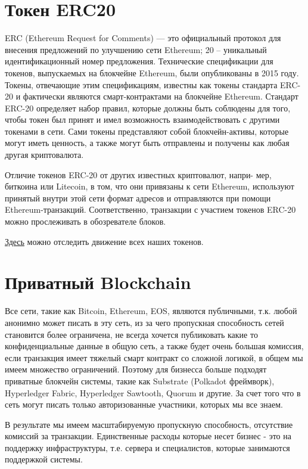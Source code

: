 \documentclass[a4paper,12pt]{report}
\newcommand{\contractAddress}{0x37d29cb7d543300063a50d85389d409c01da7945}
\begin{document}
\section{Токен ERC20}
ERC (Ethereum Request for Comments) — это официальный протокол для внесения предложений по улучшению сети Ethereum; 20 – уникальный идентификационный номер предложения. Технические спецификации для токенов, выпускаемых на блокчейне Ethereum, были опубликованы в 2015 году. Токены, отвечающие этим спецификациям, известны как токены стандарта ERC-20 и фактически являются смарт-контрактами на блокчейне Ethereum. Стандарт ERC-20 определяет набор правил, которые должны быть
соблюдены для того, чтобы токен был принят и имел возможность взаимодействовать с другими токенами в сети. Сами токены представляют собой блокчейн-активы, которые могут иметь ценность, а также могут быть отправлены и получены как любая другая криптовалюта. 

Отличие токенов ERC-20 от других известных криптовалют, напри-
мер, биткоина или Litecoin, в том, что они привязаны к сети Ethereum, используют принятый внутри этой сети формат адресов и отправляются при помощи Ethereum-транзакций. Соответственно, транзакции с участием токенов ERC-20 можно прослеживать в обозревателе блоков.


\href{https://etherscan.io/address/\contractAddress}{Здесь} можно отследить движение всех наших токенов.

\section{Приватный Blockchain}
Все сети, такие как Bitcoin, Ethereum, EOS, являются публичными, т.к. любой анонимно может писать в эту сеть, из за чего пропускная способность сетей становится более ограничена, не всегда хочется публиковать какие то конфиденциальные данные в общую сеть, а также будет очень большая комиссия, если транзакция имеет тяжелый смарт контракт со сложной логикой, в общем мы имеем множество ограничений. Поэтому для бизнесса больше подходят приватные блокчейн системы, такие как Substrate (Polkadot фреймворк), Hyperledger Fabric, Hyperledger Sawtooth, Quorum и другие. За счет того что в сеть могут писать только авторизованные участники, которых мы все знаем. 

В результате мы имеем масштабируемую пропускную способность, отсутствие комиссий за транзакции. Единственные расходы которые несет бизнес - это на поддержку инфраструктуры, т.е. сервера и специалистов, которые занимаются поддержкой системы.
\end{document}

